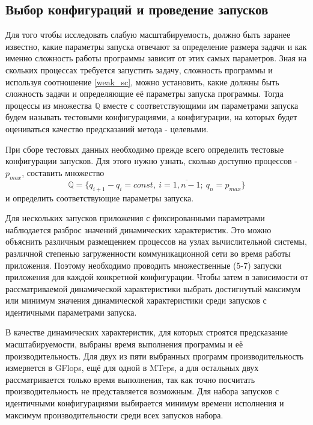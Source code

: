 	\subsection{Выбор конфигураций и проведение запусков}
		Для того чтобы исследовать слабую масштабируемость, должно быть заранее известно, какие параметры запуска отвечают за определение размера задачи и как именно сложность работы программы зависит от этих самых параметров. Зная на скольких процессах требуется запустить задачу, сложность программы и используя соотношение \eqref{weak_sc}, можно установить, какие должны быть сложность задачи и определяющие её параметры запуска программы. Тогда процессы из множества \(\mathbb{Q}\) вместе с соответствующими им параметрами запуска будем называть тестовыми конфигурациями, а конфигурации, на которых будет оцениваться качество предсказаний метода - целевыми.

		При сборе тестовых данных необходимо прежде всего определить тестовые конфигурации запусков. Для этого нужно узнать, сколько доступно процессов - \(p_{max}\), составить множество \[\mathbb{Q} = \{q_{i + 1} - q_{i} = const,\ i = \overline{1,n - 1};\ q_n = p_{max}\}\] и определить соответствующие параметры запуска.


		Для нескольких запусков приложения с фиксированными параметрами наблюдается разброс значений динамических характеристик. Это можно объяснить различным размещением процессов на узлах вычислительной системы, различной степенью загруженности коммуникационной сети во время работы приложения. Поэтому необходимо проводить множественные (5-7) запуски приложения для каждой конкретной конфигурации. Чтобы затем в зависимости от рассматриваемой динамической характеристики выбрать достигнутый максимум или минимум значения динамической характеристики среди запусков с идентичными параметрами запуска.

		В качестве динамических характеристик, для которых строятся предсказание масштабируемости, выбраны время выполнения программы и её производительность. Для двух из пяти выбранных программ производительность измеряется в GFlops, ещё для одной в MTeps, а для остальных двух рассматривается только время выполнения, так как точно посчитать производительность не представляется возможным. Для набора запусков с идентичными конфигурациями выбирается минимум времени исполнения и максимум производительности среди всех запусков набора.

